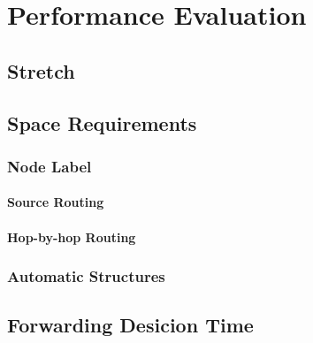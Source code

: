 
\chapter{Performance Evaluation}
\label{ch:performance_evaluation} %



\ifpdf
    \graphicspath{{6_performance_evaluation/figures/PNG/}{6_performance_evaluation/figures/PDF/}{6_performance_evaluation/figures/}}
\else
    \graphicspath{{6_performance_evaluation/figures/EPS/}{6_performance_evaluation/figures/}}
\fi

\section{Stretch}

\section{Space Requirements}

 \subsection{Node Label}

    \subsubsection{Source Routing}

    \subsubsection{Hop-by-hop Routing}

  \subsection{Automatic Structures}

\section{Forwarding Desicion Time}


